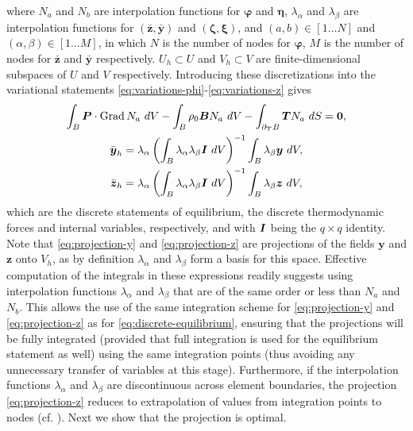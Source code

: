 \documentclass[12pt]{article}
\newcommand{\mbs}[1]{\boldsymbol{#1}}
\def\bP{{\mbs{P}}} \def\bQ{{\mbs{Q}}} \def\bR{{\mbs{R}}}
\def\by{{\mbs{y}}} \def\bz{{\mbs{z}}}
\def\bzeta{{\mbs{\zeta}}}
\def\beeta{{\mbs{\eta}}}
\def\bxi{{\mbs{\xi}}}
\def\bvarphi{{\mbs{\varphi}}}
\DeclareMathOperator{\Grad}{Grad}
\begin{document}
where $N_a$ and $N_b$ are interpolation functions for $\bvarphi$ and
$\beeta$, $\lambda_\alpha$ and $\lambda_\beta$ are interpolation
functions for $(\bar{\bz}, \bar{\by})$ and $(\bzeta, \bxi)$, and
$(a,b) \in [1 \ldots N]$ and $(\alpha, \beta) \in [1 \ldots M]$, in
which $N$ is the number of nodes for $\bvarphi$, $M$ is the number of
nodes for $\bar{\bz}$ and $\bar{\by}$ respectively. $U_h \subset
U$ and $V_h \subset V$ are finite-dimensional subspaces of $U$ and $V$
respectively. Introducing these discretizations into the variational statements
\eqref{eq:variations-phi}-\eqref{eq:variations-z} gives
\begin{gather}
  \int_B \bP \cdot \Grad N_a \ dV
  -
  \int_B \rho_0 \bB N_a \ dV
  -
  \int_{\partial_T B} \bT N_a \ dS
  =
  \mathbf{0}, \label{eq:discrete-equilibrium}
  \\
  \bar{\by}_h
  =
  \lambda_\alpha
  \left(
  \int_B \lambda_\alpha \lambda_\beta \bI \ dV
  \right)^{-1}
  \int_B \lambda_\beta \by \ dV, \label{eq:projection-y}
  \\
  \bar{\bz}_h
  =
  \lambda_\alpha
  \left(
  \int_B \lambda_\alpha \lambda_\beta \bI \ dV
  \right)^{-1}
  \int_B \lambda_\beta \bz \ dV, \label{eq:projection-z}
\end{gather}
which are the discrete statements of equilibrium, the discrete
thermodynamic forces and internal variables, respectively, and with
$\bI$ being the $q \times q$ identity. Note that
\eqref{eq:projection-y} and \eqref{eq:projection-z} are projections of
the fields $\by$ and $\bz$ onto $V_h$, as by definition
$\lambda_\alpha$ and $\lambda_\beta$ form a basis for this space.
Effective computation of the integrals in these expressions readily
suggests using interpolation functions $\lambda_\alpha$ and
$\lambda_\beta$ that are of the same order or less than $N_a$ and
$N_b$. This allows the use of the same integration scheme for
\eqref{eq:projection-y} and \eqref{eq:projection-z} as for
\eqref{eq:discrete-equilibrium}, ensuring that the projections will be
fully integrated (provided that full integration is used for the
equilibrium statement as well) using the same integration points (thus
avoiding any unnecessary transfer of variables at this
stage). Furthermore, if the interpolation functions $\lambda_\alpha$
and $\lambda_\beta$ are discontinuous across element boundaries, the
projection \eqref{eq:projection-z} reduces to extrapolation of values
from integration points to nodes (cf. \citet{Ortiz.Quigley:1991,
  Radovitzky.Ortiz:1999}).  Next we show that the projection is
optimal.
\end{document}
